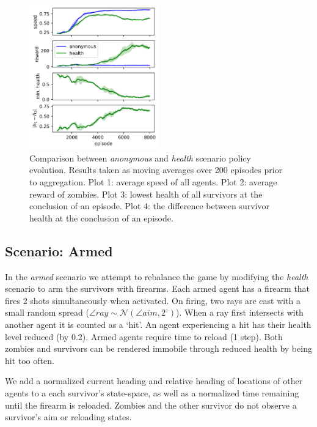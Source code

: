 \documentclass[11pt,a4paper]{article}
\begin{document}
\begin{figure}
  \centering
  \includegraphics[width=0.5\textwidth]{figures/anon_health_compare.png}
  \caption{
    Comparison between \emph{anonymous} and \emph{health} scenario policy evolution.
    Results taken as moving averages over 200 episodes prior to aggregation.
    Plot 1: average speed of all agents.
    Plot 2: average reward of zombies.
    Plot 3: lowest health of all survivors at the conclusion of an episode.
    Plot 4: the difference between survivor health at the conclusion of an episode.
  }
  \label{fig:anon_health_compare}
\end{figure}

\subsection{Scenario: Armed}
\label{sec:arms}

In the \emph{armed} scenario we attempt to rebalance the game by modifying the \emph{health} scenario to arm the survivors with firearms.
Each armed agent has a firearm that fires 2 shots simultaneously when activated.
On firing, two rays are cast with a small random spread ($\angle ray \sim \mathcal{N}(\angle aim, 2^\circ)$).
When a ray first intersects with another agent it is counted as a `hit'.
An agent experiencing a hit has their health level reduced (by 0.2).
Armed agents require time to reload (1 step).
Both zombies and survivors can be rendered immobile through reduced health by being hit too often.

We add a normalized current heading and relative heading of locations of other agents to a each survivor's state-space, as well as a normalized time remaining until the firearm is reloaded.
Zombies and the other survivor do not observe a survivor's aim or reloading states.
\end{document}
